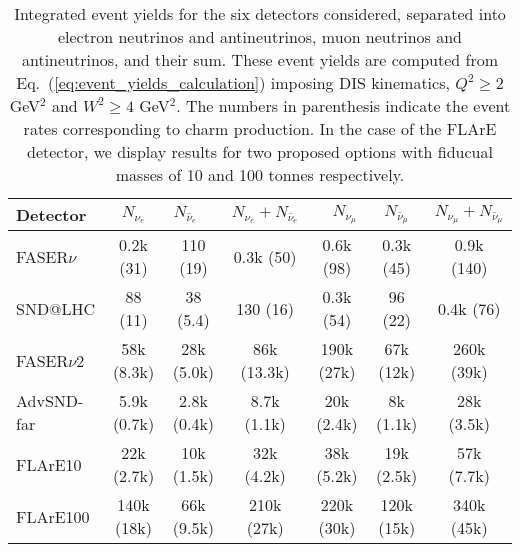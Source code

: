 \begin{table}[t]
  \centering
  \small
  \renewcommand{\arraystretch}{1.70}
\begin{tabularx}{\textwidth}{X||c|c|c||c|c|c}
\toprule
Detector & $\quad$ $N_{\nu_e}$ $\quad$ &$\quad$ $N_{\bar{\nu}_e}$$\quad$   &   $N_{\nu_e} + N_{\bar{\nu}_e}$ &
$\quad$$N_{\nu_\mu}$ $\quad$ & $\quad$ $N_{\bar{\nu}_\mu}$ $\quad$  &   $N_{\nu_\mu} + N_{\bar{\nu}_\mu}$ \\
\midrule
\midrule
FASER$\nu$  & 0.2k (31)    & 110 (19)  & 0.3k (50)  &  0.6k (98)  &  0.3k (45)  &  0.9k (140) \\
SND@LHC  &  88 (11)  & 38 (5.4)    & 130 (16)   &  0.3k (54) & 96 (22)   &  0.4k  (76)\\
\midrule
\midrule
FASER$\nu$2  & 58k (8.3k)   & 28k (5.0k)   & 86k (13.3k)  & 190k (27k)  & 67k (12k)    & 260k (39k)   \\
AdvSND-far  &  5.9k (0.7k)  & 2.8k (0.4k)   & 8.7k (1.1k)  & 20k (2.4k)  & 8k (1.1k)   & 28k (3.5k)   \\
FLArE10 & 22k (2.7k) & 10k (1.5k)   &  32k (4.2k) &  38k (5.2k)&   19k (2.5k) &   57k (7.7k) \\
FLArE100 &   140k (18k)         &    66k (9.5k)         &       210k (27k)       &   220k (30k)      &  120k (15k)    &  340k (45k)  \\
  \bottomrule
\end{tabularx}
\vspace{0.2cm}
\caption{\small Integrated event yields for the six detectors considered,
  separated into electron neutrinos and antineutrinos,
  muon neutrinos and antineutrinos, and their sum.
  These event yields are computed from Eq.~(\ref{eq:event_yields_calculation})
  imposing DIS kinematics, $Q^2 \ge 2$ GeV$^2$ and $W^2 \ge 4$ GeV$^2$.
 The numbers in parenthesis indicate the event rates corresponding to charm
 production.
 In the case of the FLArE detector, we display results for two proposed
 options with fiducual masses of 10 and 100 tonnes respectively.
  \label{tab:integrated_rates}
}
\end{table}
